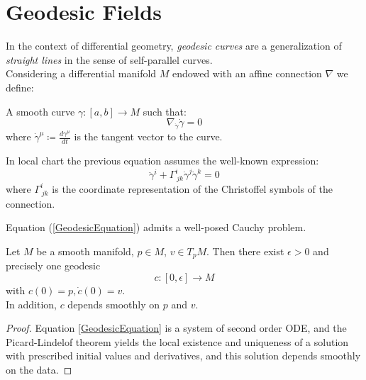 \documentclass[Main]{subfiles}
\begin{document}
\setcounter{secnumdepth}{5} %
\renewcommand\thesubsubsection{\Alph{subsubsection}}
\renewcommand\theparagraph{\thesubsubsection.\alph{paragraph}}
\renewcommand\thesubparagraph{\theparagraph.\Roman{subparagraph}}

\chapter{Geodesic Fields}
	In the context of differential geometry, \emph{geodesic curves} are a generalization of \emph{straight lines}  in the sense of self-parallel curves.\\
	Considering a differential manifold $M$ endowed with an affine connection $\nabla$ we define:
	\begin{definition}[Geodesic]
		A smooth curve $\gamma:[a,b]\rightarrow M$ such that:
		\begin{equation}
			\nabla_{\dot{\gamma}}\dot{\gamma} =0
		\end{equation}
		where $\dot{\gamma}^\mu \coloneqq \frac{d \gamma^\mu}{d t}$ is the tangent vector to the curve.
	\end{definition}
	

		In local chart the previous equation assumes the well-known expression:
		\begin{equation}\label{GeodesicEquation}
			\ddot{\gamma}^i + \Gamma^i_{\, j k} \dot{\gamma}^j \dot{\gamma}^k = 0
		\end{equation}
		where $ \Gamma^i_{\, j k}$ is the coordinate representation of the Christoffel symbols of the connection.
		
		Equation (\ref{GeodesicEquation}) admits a well-posed Cauchy problem.
		\begin{theorem}
			Let $M$ be a smooth manifold, $p\in M$, $v \in T_p M$. 
			Then there exist $\epsilon>0$ and precisely one geodesic
			\begin{displaymath}
				c: [0,\epsilon]\rightarrow M
			\end{displaymath}
			with $c(0) = p , \dot{c}(0) = v$.\\
			 In addition, $c$ depends smoothly on $p$ and $v$.
		\end{theorem}
		\begin{proof}
		Equation \ref{GeodesicEquation} is a system of second order ODE, and the Picard-Lindelof theorem yields the local existence and uniqueness of a solution with prescribed initial values and derivatives, and this solution depends smoothly on the data.
		\end{proof}
\end{document}
